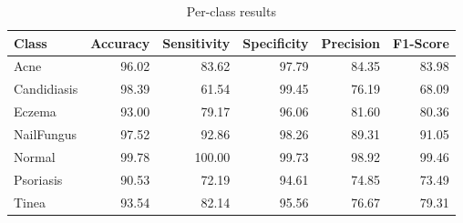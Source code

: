 \begin{table}
\caption{Per-class results}
\label{tab:results}
\begin{tabular}{lrrrrr}
\toprule
Class & Accuracy & Sensitivity & Specificity & Precision & F1-Score \\
\midrule
Acne & 96.02 & 83.62 & 97.79 & 84.35 & 83.98 \\
Candidiasis & 98.39 & 61.54 & 99.45 & 76.19 & 68.09 \\
Eczema & 93.00 & 79.17 & 96.06 & 81.60 & 80.36 \\
NailFungus & 97.52 & 92.86 & 98.26 & 89.31 & 91.05 \\
Normal & 99.78 & 100.00 & 99.73 & 98.92 & 99.46 \\
Psoriasis & 90.53 & 72.19 & 94.61 & 74.85 & 73.49 \\
Tinea & 93.54 & 82.14 & 95.56 & 76.67 & 79.31 \\
\bottomrule
\end{tabular}
\end{table}
